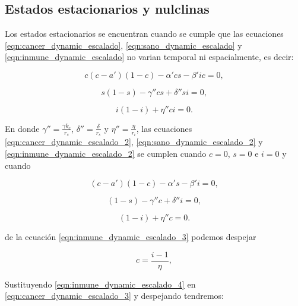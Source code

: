 \documentclass{article}
\begin{document}
\subsection{Estados estacionarios y nulclinas}

Los estados estacionarios se encuentran cuando se cumple que las ecuaciones \ref{eqn:cancer_dynamic_escalado}, \ref{eqn:sano_dynamic_escalado} y \ref{eqn:inmune_dynamic_escalado} no varian temporal ni espacialmente, es decir:

\begin{equation}
    c (c - a')(1-c) - \alpha' cs - \beta' i c = 0,
    \label{eqn:cancer_dynamic_escalado_2}
\end{equation}

\begin{equation}
     s (1 - s)  - \gamma'' cs + \delta'' si = 0,
    \label{eqn:sano_dynamic_escalado_2}
\end{equation}


\begin{equation}
    i(1-i) + \eta'' ci = 0.
    \label{eqn:inmune_dynamic_escalado_2}
\end{equation}

En donde $\gamma'' = \frac{\gamma k_c}{r_s}$,  $\delta'' = \frac{\delta}{r_s}$ y $\eta'' = \frac{\eta}{r_i}$,  las ecuaciones \ref{eqn:cancer_dynamic_escalado_2}, \ref{eqn:sano_dynamic_escalado_2} y \ref{eqn:inmune_dynamic_escalado_2} se cumplen cuando $c=0$, $s=0$ e $i=0$ y cuando 

\begin{equation}
    (c - a')(1-c) - \alpha' s - \beta' i  = 0,
    \label{eqn:cancer_dynamic_escalado_3}
\end{equation}

\begin{equation}
    (1 - s)  - \gamma'' c + \delta'' i = 0,
    \label{eqn:sano_dynamic_escalado_3}
\end{equation}


\begin{equation}
    (1-i) + \eta'' c = 0.
    \label{eqn:inmune_dynamic_escalado_3}
\end{equation}

de la ecuación  \ref{eqn:inmune_dynamic_escalado_3} podemos despejar

\begin{equation}
    c =  \frac{ i-1}{\eta},
    \label{eqn:inmune_dynamic_escalado_4}
\end{equation}

Sustituyendo \ref{eqn:inmune_dynamic_escalado_4} en \ref{eqn:cancer_dynamic_escalado_3} y despejando tendremos:
\end{document}
